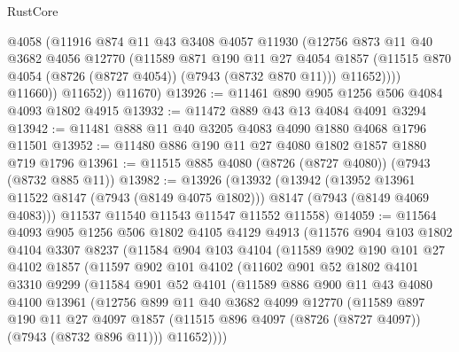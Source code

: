 \begin{lexlean}{RustCore}
\begin{coremodule}
                @4058
                (@11916
                  @874
                  @11
                  @43
                  @3408
                  @4057
                  @11930
                  (@12756
                    @873
                    @11
                    @40
                    @3682
                    @4056
                    @12770
                    (@11589
                      @871
                      @190
                      @11
                      @27
                      @4054
                      @1857
                      (@11515 @870 @4054 (@8726 (@8727 @4054)) (@7943 (@8732 @870 @11)))
                      @11652))))
              @11660))
          @11652))
      @11670)
@13926 := @11461 @890 @905 @1256 @506 @4084 @4093 @1802 @4915
@13932 := @11472 @889 @43 @13 @4084 @4091 @3294
@13942 := @11481 @888 @11 @40 @3205 @4083 @4090 @1880 @4068 @1796 @11501
@13952 := @11480 @886 @190 @11 @27 @4080 @1802 @1857 @1880 @719 @1796
@13961 := @11515 @885 @4080 (@8726 (@8727 @4080)) (@7943 (@8732 @885 @11))
@13982 := @13926
    (@13932
      (@13942
        (@13952 @13961 @11522 @8147 (@7943 (@8149 @4075 @1802)))
        @8147
        (@7943 (@8149 @4069 @4083)))
      @11537
      @11540
      @11543
      @11547
      @11552
      @11558)
@14059 := @11564
    @4093
    @905
    @1256
    @506
    @1802
    @4105
    @4129
    @4913
    (@11576
      @904
      @103
      @1802
      @4104
      @3307
      @8237
      (@11584
        @904
        @103
        @4104
        (@11589
          @902
          @190
          @101
          @27
          @4102
          @1857
          (@11597
            @902
            @101
            @4102
            (@11602
              @901
              @52
              @1802
              @4101
              @3310
              @9299
              (@11584
                @901
                @52
                @4101
                (@11589
                  @886
                  @900
                  @11
                  @43
                  @4080
                  @4100
                  @13961
                  (@12756
                    @899
                    @11
                    @40
                    @3682
                    @4099
                    @12770
                    (@11589
                      @897
                      @190
                      @11
                      @27
                      @4097
                      @1857
                      (@11515 @896 @4097 (@8726 (@8727 @4097)) (@7943 (@8732 @896 @11)))
                      @11652))))

\end{coremodule}
\end{lexlean}
